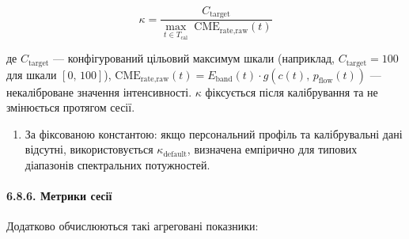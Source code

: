 \documentclass[12pt,a4paper]{article}
\begin{document}
\[\kappa = \frac{C_{\text{target}}}{\displaystyle\max_{t \in T_{\text{cal}}}\;\text{CME}_{\text{rate,raw}}(t)}\]



де \(C_{\text{target}}\) --- конфігурований цільовий максимум шкали (наприклад, \(C_{\text{target}} = 100\) для шкали \([0,\,100]\)), \(\text{CME}_{\text{rate,raw}}(t) = E_{\text{band}}(t) \cdot g(c(t),\,p_{\text{flow}}(t))\) --- некаліброване значення інтенсивності. \(\kappa\) фіксується після калібрування та не змінюється протягом сесії.



\begin{enumerate}

\def\labelenumi{\arabic{enumi}.}

\setcounter{enumi}{2}

\tightlist

\item

  За фіксованою константою: якщо персональний профіль та калібрувальні дані відсутні, використовується \(\kappa_{\text{default}}\), визначена емпірично для типових діапазонів спектральних потужностей.

\end{enumerate}



\paragraph{6.8.6. Метрики сесії}\label{ux43cux435ux442ux440ux438ux43aux438-ux441ux435ux441ux456ux457}



Додатково обчислюються такі агреговані показники:
\end{document}
